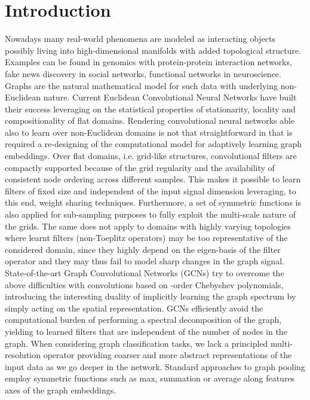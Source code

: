\documentclass[runningheads]{llncs}
\begin{document}
\section{Introduction}
Nowadays many real-world phenomena are modeled as interacting objects possibly living into high-dimensional manifolds with added topological structure. Examples can be found in genomics with protein-protein interaction networks, fake news discovery in social networks, functional networks in neuroscience. Graphs are the natural mathematical model for such data with underlying non-Euclidean nature.
Current Euclidean Convolutional Neural Networks have built their success leveraging on the statistical properties of stationarity, locality and compositionality of flat domains. Rendering convolutional neural networks able also to learn over non-Euclidean domains is not that straightforward in that is required a re-designing of the computational model for adaptively learning graph embeddings.
Over flat domains, i.e. grid-like structures, convolutional filters are compactly supported because of the grid regularity and the availability of consistent node ordering across different samples. This makes it possible to learn filters of fixed size and independent of the input signal dimension leveraging, to this end, weight sharing techniques. Furthermore, a set of symmetric functions is also applied for sub-sampling purposes to fully exploit the multi-scale nature of the grids.
The same does not apply to domains with highly varying topologies where learnt filters (non-Toeplitz operators) may be too representative of the considered domain, since they highly depend on the eigen-basis of the filter operator and they may thus fail to model sharp changes in the graph signal.
State-of-the-art Graph Convolutional Networks (GCNs) \cite{DBLP:journals/corr/DefferrardBV16,DBLP:journals/corr/KipfW16} try to overcome the above difficulties with convolutions based on -order Chebyshev polynomials, introducing the interesting duality of implicitly learning the graph spectrum by simply acting on the spatial representation. GCNs efficiently avoid the computational burden of performing a spectral decomposition of the graph, yielding to learned filters that are independent of the number of nodes in the graph.  When considering graph classification tasks, we lack a principled multi-resolution operator providing coarser and more abstract representations of the input data as we go deeper in the network. Standard approaches to graph pooling employ symmetric functions such as max, summation or average along features axes of the graph embeddings.
\end{document}
